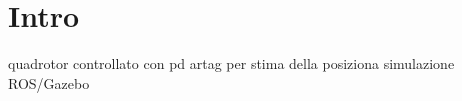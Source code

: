 \section{Intro}

quadrotor controllato con pd
artag per stima della posiziona
simulazione ROS/Gazebo